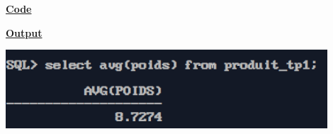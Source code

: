 \newpage
{}

\textbf{\underline{Code}}


\vspace{1cm}
\textbf{\underline{Output}}
\vspace{1cm}
\begin{center}
    \includegraphics[width=0.9\textwidth]{Questions/q27/q27.png}
\end{center}


